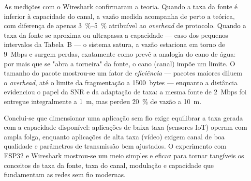 \documentclass[
  12pt,
  a4paper,
  oneside,
  brazil,
  chapter=TITLE,
  section=TITLE,
]{abntex2}
\begin{document}
As medições com o Wireshark confirmaram a teoria. Quando a taxa da fonte é
inferior à capacidade do canal, a vazão medida acompanha de perto a teórica,
com diferença de apenas \SIrange{3}{5}{\percent} atribuível ao \textit{overhead}
de protocolo. Quando a taxa da fonte se aproxima ou ultrapassa a capacidade ---
caso dos pequenos intervalos da Tabela~B --- o sistema satura, a vazão estaciona
em torno de \SI{9}{Mbps} e surgem perdas, exatamente como prevê a analogia do
cano de água: por mais que se "abra a torneira" da fonte, o cano (canal) impõe
um limite. O tamanho do pacote mostrou-se um fator de \emph{eficiência} ---
pacotes maiores diluem o \textit{overhead}, até o limite da fragmentação a
\SI{1500}{bytes} --- enquanto a distância evidenciou o papel da SNR e da
adaptação de taxa: a mesma fonte de \SI{2}{Mbps} foi entregue integralmente a
\SI{1}{m}, mas perdeu \SI{20}{\percent} de vazão a \SI{10}{m}.

Conclui-se que dimensionar uma aplicação sem fio exige equilibrar a taxa gerada
com a capacidade disponível: aplicações de baixa taxa (sensores IoT) operam com
ampla folga, enquanto aplicações de alta taxa (vídeo) exigem canal de boa
qualidade e parâmetros de transmissão bem ajustados. O experimento com ESP32 e
Wireshark mostrou-se um meio simples e eficaz para tornar tangíveis os conceitos
de taxa da fonte, taxa do canal, modulação e capacidade que fundamentam as
redes sem fio modernas.


\end{document}
